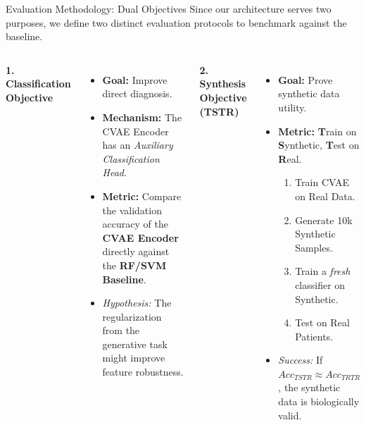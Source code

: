 \documentclass[aspectratio=169, 10pt]{beamer}
\begin{document}
\begin{frame}{Evaluation Methodology: Dual Objectives}
    Since our architecture serves two purposes, we define two distinct evaluation protocols to benchmark against the baseline.
    
    \vspace{1em}
    \begin{columns}[t]
        \textbf{1. Classification Objective}
        \begin{itemize}
            \item \textbf{Goal:} Improve direct diagnosis.
            \item \textbf{Mechanism:} The CVAE Encoder has an \textit{Auxiliary Classification Head}.
            \item \textbf{Metric:} Compare the validation accuracy of the \textbf{CVAE Encoder} directly against the \textbf{RF/SVM Baseline}.
            \item \textit{Hypothesis:} The regularization from the generative task might improve feature robustness.
        \end{itemize}

        \textbf{2. Synthesis Objective (TSTR)}
        \begin{itemize}
            \item \textbf{Goal:} Prove synthetic data utility.
            \item \textbf{Metric:} \textbf{T}rain on \textbf{S}ynthetic, \textbf{T}est on \textbf{R}eal.
            \begin{enumerate}
                \item Train CVAE on Real Data.
                \item Generate 10k Synthetic Samples.
                \item Train a \textit{fresh} classifier on Synthetic.
                \item Test on Real Patients.
            \end{enumerate}
            \item \textit{Success:} If $Acc_{TSTR} \approx Acc_{TRTR}$, the synthetic data is biologically valid.
        \end{itemize}
    \end{columns}
\end{frame}
\end{document}
